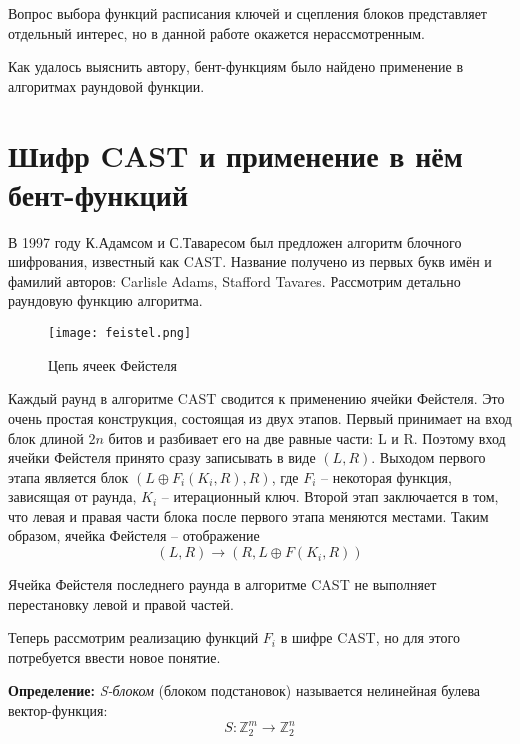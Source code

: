 \documentclass[12pt, a4paper, reqno]{article}
\begin{document}
    Вопрос выбора функций расписания ключей и сцепления блоков представляет отдельный интерес, но
    в данной работе окажется нерассмотренным.

    Как удалось выяснить автору, бент-функциям было найдено применение в алгоритмах раундовой
    функции.

\section{Шифр CAST и применение в нём бент-функций}

    В 1997 году К.Адамсом и С.Таваресом был предложен алгоритм блочного шифрования, известный как
    CAST. Название получено из первых букв имён и фамилий авторов: Carlisle Adams, Stafford Tavares.
    Рассмотрим детально раундовую функцию алгоритма.

    \begin{wrapfigure}{r}{0.25\textwidth}
        \centering
        \texttt{[image: feistel.png]}
        \caption{Цепь ячеек Фейстеля}
    \end{wrapfigure}

    Каждый раунд в алгоритме CAST сводится к применению ячейки Фейстеля. Это очень простая
    конструкция, состоящая из двух этапов. Первый принимает на вход блок длиной $2n$ битов и
    разбивает его на две равные части: L и R. Поэтому вход ячейки Фейстеля принято сразу записывать
    в виде $(L, R)$. Выходом первого этапа является блок $(L \oplus F_i(K_i, R), R)$, где $F_i$ --
    некоторая функция, зависящая от раунда, $K_i$ -- итерационный ключ. Второй этап заключается в
    том, что левая и правая части блока после первого этапа меняются местами. Таким образом, ячейка
    Фейстеля -- отображение
    \begin{equation*}
        (L, R) \to (R, L \oplus F(K_i, R))
    \end{equation*}

    Ячейка Фейстеля последнего раунда в алгоритме CAST не выполняет перестановку левой и правой
    частей.

    Теперь рассмотрим реализацию функций $F_i$ в шифре CAST, но для этого потребуется ввести новое
    понятие.

    \textbf{Определение:} \textit{S-блоком} (блоком подстановок) называется нелинейная булева
    вектор-функция:
    \begin{equation*}
        S: \mathbb{Z}_2^m \to \mathbb{Z}_2^n
    \end{equation*}
\end{document}
